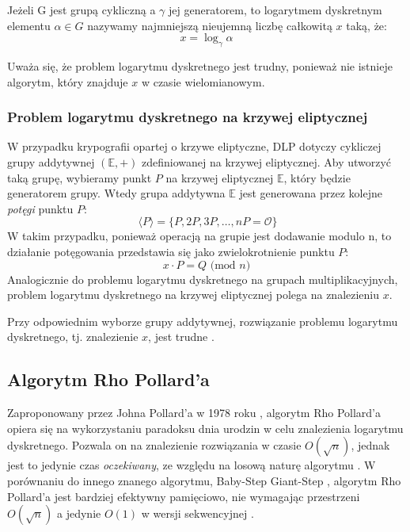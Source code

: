 Jeżeli G jest grupą cykliczną a $\gamma$ jej generatorem, to logarytmem dyskretnym
elementu $\alpha \in G$ nazywamy najmniejszą nieujemną liczbę całkowitą $x$ taką, że:
\[x = \log_{\gamma}{\alpha}\]

Uważa się, że problem logarytmu dyskretnego jest trudny, ponieważ nie istnieje
algorytm, który znajduje $x$ w czasie wielomianowym\cite{Stinson2021}.


\subsubsection{Problem logarytmu dyskretnego na krzywej eliptycznej}
W przypadku krypografii opartej o krzywe eliptyczne, DLP dotyczy cykliczej \\
grupy addytywnej $(\mathbb{E},+)$ zdefiniowanej na krzywej eliptycznej.
Aby utworzyć taką grupę, wybieramy punkt $P$ na krzywej eliptycznej $\mathbb{E}$,
który będzie generatorem grupy. Wtedy grupa addytywna $\mathbb{E}$ jest generowana przez
kolejne \textit{potęgi} punktu $P$:
\[\ \langle P \rangle = \{P, 2P, 3P, \ldots, nP = \mathcal{O}\}\]
W takim przypadku, ponieważ operacją na grupie jest dodawanie modulo n, to działanie
potęgowania przedstawia się jako zwielokrotnienie punktu $P$:
\[x \cdot P = Q \textrm{ (mod } n)\]
Analogicznie do problemu logarytmu dyskretnego na grupach multiplikacyjnych,
problem logarytmu dyskretnego na krzywej eliptycznej polega na znalezieniu
$x$.
\par
Przy odpowiednim wyborze grupy addytywnej, rozwiązanie problemu logarytmu dyskretnego,
tj. znalezienie $x$,
jest trudne \cite{Stinson2021}.


\subsection{Algorytm Rho Pollard'a}

Zaproponowany przez Johna Pollard'a w 1978 roku \cite{Pollard1978},
algorytm Rho Pollard'a opiera się na wykorzystaniu paradoksu dnia urodzin w celu znalezienia logarytmu dyskretnego.
Pozwala on na znalezienie rozwiązania w czasie $O(\sqrt{n})$,
jednak jest to jedynie czas \textit{oczekiwany}, ze względu na losową naturę algorytmu \cite{Blake2005}.
W porównaniu do innego znanego algorytmu, Baby-Step Giant-Step \cite{Stinson2021}, algorytm Rho Pollard'a jest bardziej
efektywny pamięciowo, nie wymagając
przestrzeni $O(\sqrt{n})$ a jedynie $O(1)$ w wersji sekwencyjnej \cite{Stinson2021}\cite{Blake2005}.
\par

